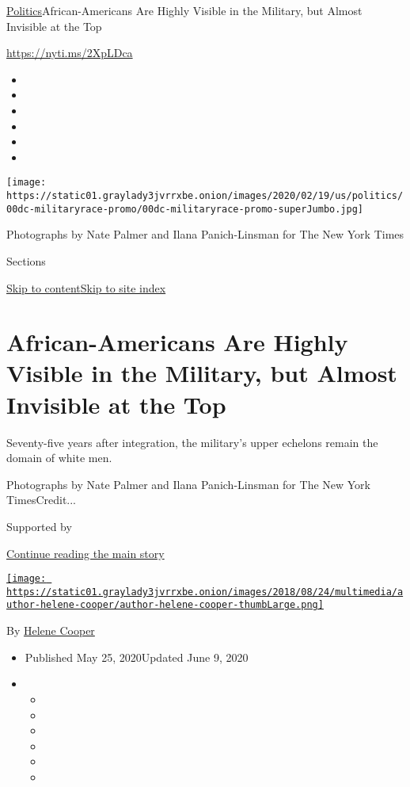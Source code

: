 \href{/section/politics}{Politics}\textbar{}African-Americans Are Highly
Visible in the Military, but Almost Invisible at the Top

\url{https://nyti.ms/2XpLDca}

\begin{itemize}
\item
\item
\item
\item
\item
\item
\end{itemize}

\texttt{[image: https://static01.graylady3jvrrxbe.onion/images/2020/02/19/us/politics/00dc-militaryrace-promo/00dc-militaryrace-promo-superJumbo.jpg]}

Photographs by Nate Palmer and Ilana Panich-Linsman for The New York
Times

Sections

\protect\hyperlink{site-content}{Skip to
content}\protect\hyperlink{site-index}{Skip to site index}

\hypertarget{african-americans-are-highly-visible-in-the-military-but-almost-invisible-at-the-top}{%
\section{African-Americans Are Highly Visible in the Military, but
Almost Invisible at the
Top}\label{african-americans-are-highly-visible-in-the-military-but-almost-invisible-at-the-top}}

Seventy-five years after integration, the military's upper echelons
remain the domain of white men.

Photographs by Nate Palmer and Ilana Panich-Linsman for The New York
TimesCredit...

Supported by

\protect\hyperlink{after-sponsor}{Continue reading the main story}

\href{https://www.nytimes3xbfgragh.onion/by/helene-cooper}{\texttt{[image: https://static01.graylady3jvrrxbe.onion/images/2018/08/24/multimedia/author-helene-cooper/author-helene-cooper-thumbLarge.png]}}

By \href{https://www.nytimes3xbfgragh.onion/by/helene-cooper}{Helene
Cooper}

\begin{itemize}
\item
  Published May 25, 2020Updated June 9, 2020
\item
  \begin{itemize}
  \item
  \item
  \item
  \item
  \item
  \item
  \end{itemize}
\end{itemize}

